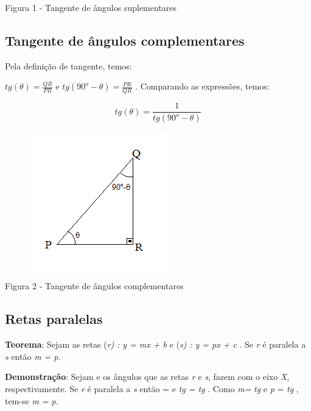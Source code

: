 Figura 1 - Tangente de ângulos suplementares

\subsection{Tangente de ângulos complementares}

Pela definição de tangente, temos:

 \( tg \left(  \theta  \right) =\frac{QR}{PR} \)        e     \( tg \left( 90^{o}- \theta  \right) =\frac{PR}{QR} \)   . Comparando as expressões, temos:

 \[ tg \left(  \theta  \right) =\frac{1}{tg \left( 90^{o}- \theta  \right) } \] 

\begin{figure}[H]
	\begin{Center}
		\includegraphics[width=2.35in,height=2.34in]{capitulos/funcao_do_primeiro_grau/media/image66.png}
	\end{Center}
\end{figure}

\begin{Center}
Figura 2 - Tangente de ângulos complementares
\end{Center}

\subsection{Retas paralelas}

\textbf{Teorema}: Sejam as retas    (\textit{r) :}   \textit{y = mx + b}   e   (\textit{s) :}   \textit{y = px + c}    . Se \textit{r} é paralela a \textit{s} então \textit{m = p}.   

\textbf{Demonstração}: Sejam    e    os ângulos que as retas \textit{r} e \textit{s}, fazem com o eixo \textit{X}, respectivamente. Se \textit{r} é paralela a \textit{s} então    =      e\textit{   tg    =  tg }  . Como \textit{m=} \textit{tg   }e \textit{p} = \textit{tg }  , tem-se   \textit{m = p}.

